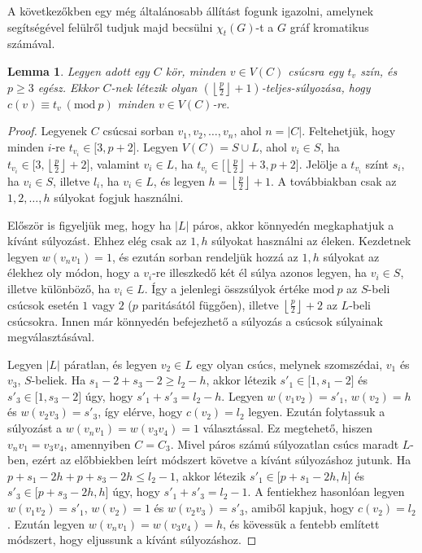\documentclass[12pt, a4paper]{report}
\newtheorem{lem}[tét]{Lemma}
\theoremstyle{remark}
\theoremstyle{definition}
\begin{document}
A következőkben egy még általánosabb állítást fogunk igazolni, amelynek segítségével felülről tudjuk majd becsülni $\chi_t(G)$-t a $G$ gráf kromatikus számával.

\begin{lem} \label{lem:totalcircle}
Legyen adott egy $C$ kör, minden $v \in V(C)$ csúcsra egy $t_v$ szín, és $p \geq 3$ egész. Ekkor $C$-nek létezik olyan $\left( \left\lfloor \frac{p}{2} \right\rfloor + 1 \right)$-teljes-súlyozása, hogy $c(v) ≡ t_v\ (\mathrm{mod}\ p)$ minden $v \in V(C)$-re.
\end{lem}

\begin{proof}
Legyenek $C$ csúcsai sorban $v_1, v_2, \ldots, v_n$, ahol $n = |C|$. Feltehetjük, hogy minden $i$-re $t_{v_i} \in \lbrack 3, p + 2 \rbrack$. Legyen $V(C) = S \cup L$, ahol $v_i \in S$, ha $t_{v_i} \in \lbrack 3, \left\lfloor \frac{p}{2} \right\rfloor + 2 \rbrack$, valamint $v_i \in L$, ha $t_{v_i} \in \lbrack \left\lfloor \frac{p}{2} \right\rfloor + 3, p + 2 \rbrack$. Jelölje a $t_{v_i}$ színt $s_i$, ha $v_i \in S$, illetve $l_i$, ha $v_i \in L$, és legyen $h = \left\lfloor \frac{p}{2} \right\rfloor + 1$. A továbbiakban csak az $1, 2, \ldots, h$ súlyokat fogjuk használni. 

Először is figyeljük meg, hogy ha $|L|$ páros, akkor könnyedén megkaphatjuk a kívánt súlyozást. Ehhez elég csak az $1, h$ súlyokat használni az éleken. Kezdetnek legyen $w(v_n v_1) = 1$, és ezután sorban rendeljük hozzá az $1, h$ súlyokat az élekhez oly módon, hogy a $v_i$-re illeszkedő két él súlya azonos legyen, ha $v_i \in S$, illetve különböző, ha $v_i \in L$. Így a jelenlegi összsúlyok értéke $\mathrm{mod}\ p$ az $S$-beli csúcsok esetén $1$ vagy $2$ ($p$ paritásától függően), illetve $\left\lfloor \frac{p}{2} \right\rfloor + 2$ az $L$-beli csúcsokra. Innen már könnyedén befejezhető a súlyozás a csúcsok súlyainak megválasztásával.

Legyen $|L|$ páratlan, és legyen $v_2 \in L$ egy olyan csúcs, melynek szomszédai, $v_1$ és $v_3$, $S$-beliek. Ha $s_1 - 2 + s_3 - 2 \geq l_2 - h$, akkor létezik $s'_1 \in \lbrack 1, s_1 - 2 \rbrack$ és $s'_3 \in \lbrack 1, s_3 - 2 \rbrack$ úgy, hogy $s'_1 + s'_3 = l_2 - h$. Legyen $w(v_1 v_2) = s'_1$, $w(v_2) = h$ és $w(v_2 v_3) = s'_3$, így elérve, hogy $c(v_2) = l_2$ legyen. Ezután folytassuk a súlyozást a $w(v_n v_1) = w(v_3 v_4) = 1$ választással. Ez megtehető, hiszen $v_n v_1 = v_3 v_4$, amennyiben $C = C_3$. Mivel páros számú súlyozatlan csúcs maradt $L$-ben, ezért az előbbiekben leírt módszert követve a kívánt súlyozáshoz jutunk. Ha $p + s_1 - 2h + p + s_3 - 2h \leq l_2 - 1$, akkor létezik $s'_1 \in \lbrack p + s_1 - 2h, h \rbrack$ és $s'_3 \in \lbrack p + s_3 - 2h, h \rbrack$ úgy, hogy $s'_1 + s'_3 = l_2 - 1$. A fentiekhez hasonlóan legyen $w(v_1 v_2)= s'_1$, $w(v_2) = 1$ és $w(v_2 v_3) = s'_3$, amiből kapjuk, hogy $c(v_2) = l_2$. Ezután legyen $w(v_n v_1) = w(v_3 v_4) = h$, és kövessük a fentebb említett módszert, hogy eljussunk a kívánt súlyozáshoz.


\end{proof}
\end{document}
